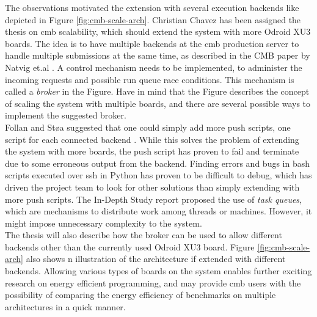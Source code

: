The observations motivated the extension with several execution backends like depicted in Figure \ref{fig:cmb-scale-arch}. Christian Chavez has been assigned the thesis on \gls{cmb} scalability, which should extend the system with more Odroid XU3 boards. The idea is to have multiple backends at the \gls{cmb} production server to handle multiple submissions at the same time, as described in the CMB paper by Natvig et.al \cite{a:CMB}. A control mechanism needs to be implemented, to administer the incoming requests and possible run queue race conditions. This mechanism is called a \textit{broker} in the Figure. Have in mind that the Figure describes the concept of scaling the system with multiple boards, and there are several possible ways to implement the suggested broker. \\

Follan and Støa suggested that one could simply add more push scripts, one script for each connected backend \cite{mt:T&S}. While this solves the problem of extending the system with more boards, the push script has proven to fail and terminate due to some erroneous output from the backend. Finding errors and bugs in bash scripts executed over \gls{ssh} in Python has proven to be difficult to debug, which has driven the project team to look for other solutions than simply extending with more push scripts. The In-Depth Study report proposed the use of \textit{task queues}, which are mechanisms to distribute work among threads or machines. However, it might impose unnecessary complexity to the system.  \\

The thesis will also describe how the broker can be used to allow different backends other than the currently used Odroid XU3 board. Figure \ref{fig:cmb-scale-arch} also shows n illustration of the architecture if extended with different backends. Allowing various types of boards on the system enables further exciting research on energy efficient programming, and may provide \gls{cmb} users with the possibility of comparing the energy efficiency of benchmarks on multiple architectures in a quick manner.

